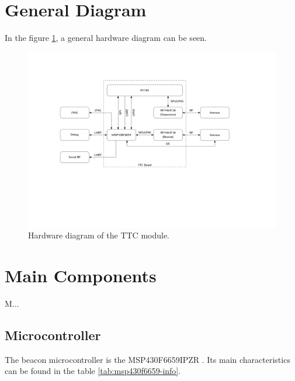 \documentclass[12pt]{book}
\begin{document}
\section{General Diagram}

In the figure \ref{fig:hardware-diagram}, a general hardware diagram can be seen.

\begin{figure}[!h]
	\begin{center}
		\includegraphics[width=\textwidth]{figures/hardware_diagram.pdf}
		\caption{Hardware diagram of the TTC module.}
		\label{fig:hardware-diagram}
	\end{center}
\end{figure}

\section{Main Components}

M...

\subsection{Microcontroller}

The beacon microcontroller is the MSP430F6659IPZR \cite{msp430f6659}. Its main characteristics can be found in the table \ref{tab:msp430f6659-info}.

\end{document}
